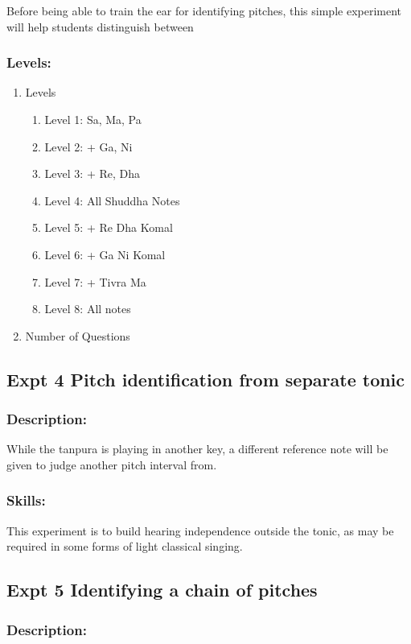 \documentclass[11pt]{article}
\begin{document}
Before being able to train the ear for identifying pitches, this
simple experiment will help students distinguish between 
\subsubsection{Levels:}
\label{sec-1-4-3}


\begin{enumerate}
\item Levels
\begin{enumerate}
\item Level 1: Sa, Ma, Pa
\item Level 2: + Ga, Ni
\item Level 3: + Re, Dha
\item Level 4: All Shuddha Notes
\item Level 5: + Re Dha Komal
\item Level 6: + Ga Ni Komal
\item Level 7: + Tivra Ma
\item Level 8: All notes
\end{enumerate}
\item Number of Questions
\end{enumerate}
\subsection{Expt 4 Pitch identification from separate tonic}
\label{sec-1-5}
\subsubsection{Description:}
\label{sec-1-5-1}

While the tanpura is playing in another key, a different reference
note will be given to judge another pitch interval from.
\subsubsection{Skills:}
\label{sec-1-5-2}

This experiment is to build hearing independence outside the tonic, as may be required in some forms of light classical singing.
\subsection{Expt 5 Identifying a chain of pitches}
\label{sec-1-6}
\subsubsection{Description:}
\label{sec-1-6-1}
\end{document}
